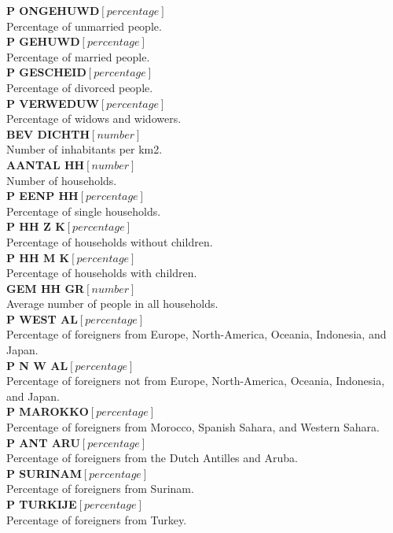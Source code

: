 \textbf{P ONGEHUWD}$ [percentage]$ \\
Percentage of unmarried people. \\
\textbf{P GEHUWD}$ [percentage]$ \\
Percentage of married people. \\
\textbf{P GESCHEID}$ [percentage]$ \\
Percentage of divorced people. \\
\textbf{P VERWEDUW}$ [percentage]$ \\
Percentage of widows and widowers. \\
\textbf{BEV DICHTH}$ [number]$ \\
Number of inhabitants per km2. \\
\textbf{AANTAL HH}$ [number]$ \\
Number of households. \\
\textbf{P EENP HH}$ [percentage]$ \\
Percentage of single households. \\
\textbf{P HH Z K}$ [percentage]$ \\
Percentage of households without children. \\
\textbf{P HH M K}$ [percentage]$ \\
Percentage of households with children. \\
\textbf{GEM HH GR}$ [number]$ \\
Average number of people in all households. \\
\textbf{P WEST AL}$ [percentage]$ \\
Percentage of foreigners from Europe, North-America, Oceania, Indonesia, and Japan. \\
\textbf{P N W AL}$ [percentage]$ \\
Percentage of foreigners not from Europe, North-America, Oceania, Indonesia, and Japan. \\
\textbf{P MAROKKO}$ [percentage]$ \\
Percentage of foreigners from Morocco, Spanish Sahara, and Western Sahara. \\
\textbf{P ANT ARU}$ [percentage]$ \\
Percentage of foreigners from the Dutch Antilles and Aruba. \\
\textbf{P SURINAM}$ [percentage]$ \\
Percentage of foreigners from Surinam. \\
\textbf{P TURKIJE}$ [percentage] $\\
Percentage of foreigners from Turkey. \\
